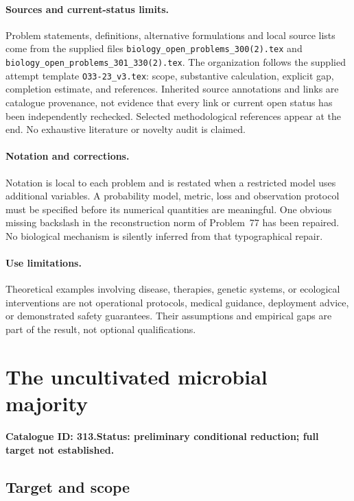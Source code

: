 \documentclass[11pt]{article}
\begin{document}
\paragraph{Sources and current-status limits.}
Problem statements, definitions, alternative formulations and local source lists
come from the supplied files
\texttt{biology\_open\_problems\_300(2).tex} and
\texttt{biology\_open\_problems\_301\_330(2).tex}.
The organization follows the supplied attempt template
\texttt{O33-23\_v3.tex}: scope, substantive calculation, explicit gap,
completion estimate, and references. Inherited source annotations and links are
catalogue provenance, not evidence that every link or current open status has
been independently rechecked. Selected methodological references appear at the
end. No exhaustive literature or novelty audit is claimed.

\paragraph{Notation and corrections.}
Notation is local to each problem and is restated when a restricted model uses
additional variables. A probability model, metric, loss and observation protocol
must be specified before its numerical quantities are meaningful. One obvious
missing backslash in the reconstruction norm of Problem~77 has been repaired.
No biological mechanism is silently inferred from that typographical repair.

\paragraph{Use limitations.}
Theoretical examples involving disease, therapies, genetic systems, or ecological
interventions are not operational protocols, medical guidance, deployment advice,
or demonstrated safety guarantees. Their assumptions and empirical gaps are part
of the result, not optional qualifications.

\setcounter{section}{312}
\section{The uncultivated microbial majority}
\label{prob:313}
\noindent\textbf{Catalogue ID: 313.}\quad \textbf{Status: preliminary conditional reduction; full target not established.}
\subsection{Target and scope}
\end{document}
